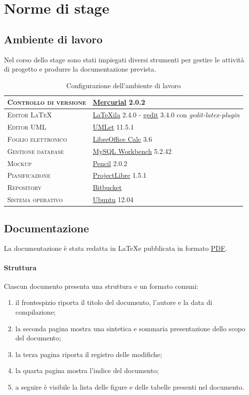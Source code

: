 \documentclass[11pt,a4paper,headsepline,hidelinks]{scrreprt} %
\begin{document}
	\section{Norme di stage}
	
	\subsection{Ambiente di lavoro}
	Nel corso dello stage sono stati impiegati diversi strumenti per gestire le attività di progetto e produrre la documentazione prevista.
	
	\begin{table}[ht]
	\centering
	\begin{tabular}{|l|l|}
	\hline
	\textsc{Controllo di versione} & \underline{Mercurial} 2.0.2 \\ \hline
	\textsc{Editor \LaTeX} & \underline{LaTeXila} 2.4.0 - \underline{gedit} 3.4.0 con \textit{gedit-latex-plugin} \\ \hline
	\textsc{Editor UML} & \underline{UMLet} 11.5.1 \\ \hline
	\textsc{Foglio elettronico} & \underline{LibreOffice Calc} 3.6 \\ \hline
	\textsc{Gestione database} & \underline{MySQL Workbench} 5.2.42 \\ \hline
	\textsc{Mockup} & \underline{Pencil} 2.0.2 \\	\hline
	\textsc{Pianificazione} & \underline{ProjectLibre} 1.5.1 \\ \hline
	\textsc{Repository} & \underline{Bitbucket} \\ \hline
	\textsc{Sistema operativo} & \underline{Ubuntu} 12.04 \\ \hline
	\end{tabular}
	\caption{Configurazione dell'ambiente di lavoro}
	\label{tab:tesi:stage:norme:strumenti}
	\end{table}

	\subsection{Documentazione}
	La documentazione è stata redatta in \LaTeX e pubblicata in formato \underline{PDF}.
	
	\paragraph{Struttura}
	Ciascun documento presenta una struttura e un formato comuni:
	\begin{enumerate}
		\item il frontespizio riporta il titolo del documento, l'autore e la data di compilazione;
		\item la seconda pagina mostra una sintetica e sommaria presentazione dello scopo del documento;
		\item la terza pagina riporta il registro delle modifiche;
		\item la quarta pagina mostra l'indice del documento;
		\item a seguire è visibile la lista delle figure e delle tabelle presenti nel documento.
	\end{enumerate}
	
\end{document}
